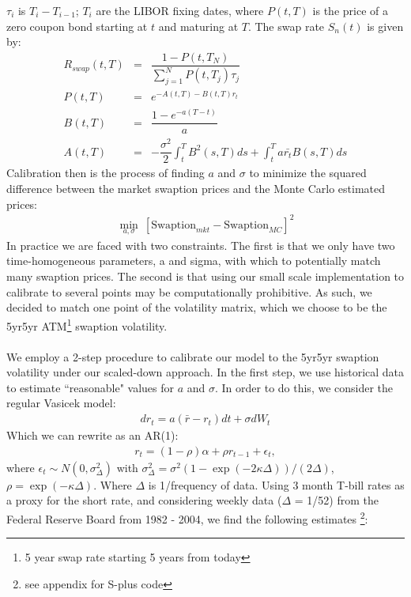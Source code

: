 \documentclass[10pt,letterpaper]{article}
\begin{document}
$\tau_i$ is $T_i - T_{i-1}$; $T_i$ are the LIBOR fixing dates, where $P(t,T)$ is the price of a zero coupon bond starting at $t$ and maturing at $T$. The swap rate $S_n(t)$ is given by:
\begin{eqnarray}
R_{swap}(t,T) & = & \dfrac{1 - P(t,T_N)}{\sum_{j=1}^N P(t,T_j)\tau_j }\\
P(t,T) & = & e^{-A(t,T) - B(t,T) r_t}\\
B(t,T) & = & \dfrac{1-e^{-a(T-t)}}{a}\\
A(t,T) & = & - \dfrac{\sigma^2}{2} \int_t^T B^2(s,T)ds + \int_t^T a \bar{r_t} B(s,T) ds
\end{eqnarray}
Calibration then is the process of finding $a$ and $\sigma$ to minimize the squared difference between the market swaption prices and the Monte Carlo estimated prices:
\begin{eqnarray}
\min_{a,\sigma} \: [\text{Swaption}_{mkt} - \text{Swaption}_{MC}]^2
\end{eqnarray}
In practice we are faced with two constraints.  The first is that we only have two time-homogeneous parameters, a and sigma, with which to potentially match many swaption prices.  The second is that using our small scale implementation to calibrate to several points may be computationally prohibitive.  As such, we decided to match one point of the volatility matrix, which we choose to be the 5yr5yr ATM\footnote{5 year swap rate starting 5 years from today} swaption volatility. \\
\\
We employ a 2-step procedure to calibrate our model to the 5yr5yr swaption volatility under our scaled-down approach.  In the first step, we use historical data to estimate ``reasonable" values for $a$ and $\sigma$.  In order to do this, we consider the regular Vasicek model:
\begin{eqnarray}
dr_t = a(\bar{r} - r_t)dt + \sigma dW_t
\end{eqnarray}
Which we can rewrite as an AR(1):
\begin{eqnarray}
r_t = (1 - \rho)\alpha + \rho r_{t-1} + \epsilon_t,
\end{eqnarray}
where $\epsilon_t \sim N(0, \sigma^2_\Delta)$ with $\sigma^2_\Delta = \sigma^2(1 - \exp(-2\kappa \Delta))/(2 \Delta)$, $\rho = \exp(-\kappa \Delta)$.  Where $\Delta$ is 1/frequency of data.  Using 3 month T-bill rates as a proxy for the short rate, and considering weekly data ($\Delta$ = 1/52) from the Federal Reserve Board from 1982 - 2004, we find the following estimates \footnote{see appendix for S-plus code}:\\
\end{document}
